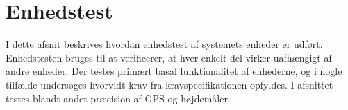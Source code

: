 \chapter{Enhedstest}
I dette afsnit beskrives hvordan enhedstest af systemets enheder er udført. Enhedstesten bruges til at verificerer, at hver enkelt del virker uafhængigt af andre enheder. 
Der testes primært basal funktionalitet af enhederne, og i nogle tilfælde undersøges hvorvidt krav fra kravspecifikationen opfyldes. I afsnittet testes blandt andet præcision af GPS og højdemåler.





\newpage


\newpage


\newpage 


%

\newpage

